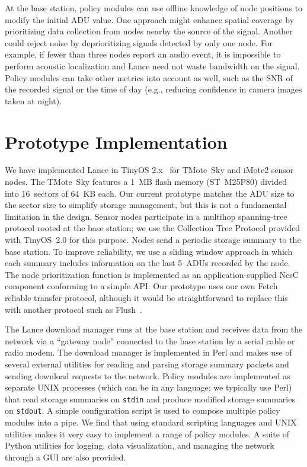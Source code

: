 \documentclass[lettersize]{sig-alternate-konrad}
\begin{document}
At the base station, policy modules can use offline knowledge of node
positions to modify the initial ADU value. One approach might enhance
spatial coverage by prioritizing data collection from nodes nearby the
source of the signal. Another could reject noise by deprioritizing signals
detected by only one node. For example, if fewer than three nodes
report an audio event, it is impossible to perform acoustic
localization and Lance need not waste bandwidth on the signal.
Policy modules can take other metrics into account as well, 
such as the SNR of the recorded signal or the time of day (e.g.,
reducing confidence in camera images taken at night).

\section{Prototype Implementation}
\label{sec-implementation}
\label{sec-implementation-nsm}

We have implemented Lance in TinyOS 2.x~\cite{tinyos-asplos00} for 
TMote~Sky and iMote2 sensor nodes. The TMote~Sky features a
1~MB flash memory (ST~M25P80) divided into 16~sectors of 64~KB each.
Our current prototype matches the ADU size to the sector size to
simplify storage management, but this is not a fundamental limitation
in the design. Sensor nodes participate in a multihop spanning-tree 
protocol rooted
at the base station; we use the Collection Tree Protocol provided with
TinyOS~2.0 for this purpose. Nodes send a periodic storage summary to the
base station. To improve reliability, we use a
sliding window approach in which each summary includes information on
the last 5~ADUs recorded by the node. The node prioritization function
is implemented as an application-supplied NesC component conforming to
a simple API. Our prototype uses our own Fetch~\cite{volcano-osdi06}
reliable transfer protocol, although it would be straightforward to
replace this with another protocol such as Flush~\cite{flush-sensys07}.

The Lance download manager runs at the base station and receives
data from the network via a ``gateway node'' connected to the base
station by a serial cable or radio modem.  The download manager is 
implemented in Perl and makes use of several external utilities for
reading and parsing storage summary packets and sending download
requests to the network. Policy modules are implemented as separate
UNIX processes (which can be in any language; we typically use Perl) 
that read storage summaries on {\tt stdin} and produce modified
storage summaries on {\tt stdout}. A simple configuration script is
used to compose multiple policy modules into a pipe. We find that
using standard scripting languages and UNIX utilities makes it very
easy to implement a range of policy modules.
A suite of Python utilities for logging, data visualization, and 
managing the network through a GUI are also provided.
\vspace{0.2in}
\end{document}
